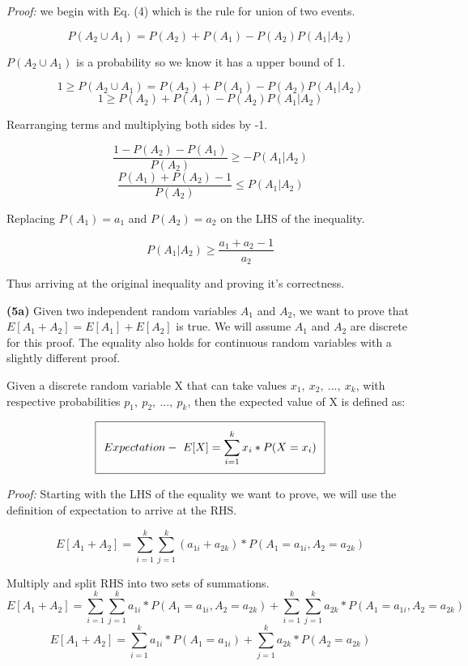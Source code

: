 \documentclass[11pt]{article}
\renewcommand\part[1]{\vspace{.10in}\textbf{(#1)}}
\begin{document}
\textit{Proof:} we begin with Eq. (4) which is the rule for union of two events.

$$P(A_2 \cup A_1) = P(A_2) + P(A_1) - P(A_2)P(A_1 | A_2)$$

$P(A_2 \cup A_1)$ is a probability so we know it has a upper bound of 1.

$$1 \geq P(A_2 \cup A_1) = P(A_2) + P(A_1) - P(A_2)P(A_1 | A_2)$$
$$1 \geq P(A_2) + P(A_1) - P(A_2)P(A_1 | A_2)$$

Rearranging terms and multiplying both sides by -1.

$$\frac{1 - P(A_2) - P(A_1)}{P(A_2)} \geq -P(A_1 | A_2)$$
$$\frac{P(A_1) + P(A_2) - 1}{P(A_2)} \leq P(A_1 | A_2)$$

Replacing $P(A_1) = a_1$ and $P(A_2) = a_2$ on the LHS of the inequality.

$$P(A_1 | A_2) \geq \frac{a_1 + a_2 - 1}{a_2}$$

Thus arriving at the original inequality and proving it's correctness.

\part{5a} Given two independent random variables $A_1$ and $A_2$, we want to prove that $E[A_1 + A_2] = E[A_1] + E[A_2]$ is true. We will assume $A_1$ and $A_2$ are discrete for this proof. The equality also holds for continuous random variables with a slightly different proof.

Given a discrete random variable X that can take values $x_1, \ x_2, \ ..., \ x_k$, with respective probabilities $p_1, \ p_2, \ ..., \ p_k$, then the expected value of X is defined as:

\begin{equation}
\setlength\fboxsep{0.25cm}
\setlength\fboxrule{0.4pt}
\boxed{Expectation- \ E[X] = \sum_{i = 1}^k x_i * P(X = x_i)}
\end{equation} 

\textit{Proof:} Starting with the LHS of the equality we want to prove, we will use the definition of expectation to arrive at the RHS.

$$E[A_1 + A_2] = \sum_{i = 1}^k \sum_{j = 1}^k (a_{1i} + a_{2k}) * P(A_1 = a_{1i}, A_2 = a_{2k})$$

Multiply and split RHS into two sets of summations.
$$E[A_1 + A_2] = \sum_{i = 1}^k \sum_{j = 1}^k a_{1i} * P(A_1 = a_{1i}, A_2 = a_{2k})  + \sum_{i = 1}^k \sum_{j = 1}^k a_{2k} * P(A_1 = a_{1i}, A_2 = a_{2k})$$
$$E[A_1 + A_2] = \sum_{i = 1}^k a_{1i} * P(A_1 = a_{1i})  + \sum_{j = 1}^k a_{2k} * P(A_2 = a_{2k})$$
\end{document}
